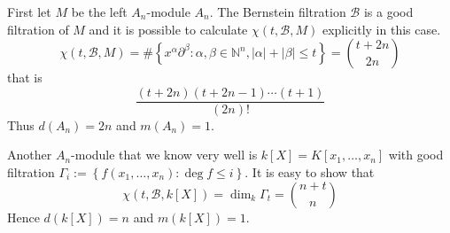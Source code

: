\documentclass[12pt, oneside]{book}
\begin{document}
\begin{example}
    First let $M$ be the left $A_n$-module $A_n$.
    The Bernstein filtration $\mathcal{B}$ is a good filtration of $M$ and it is possible to calculate $\chi(t, \mathcal{B}, M)$ explicitly in this case.
    \begin{equation*}
        \chi(t, \mathcal{B}, M)=
        \#\left\{x^\alpha \partial^\beta : \alpha,\beta \in \mathbb{N}^n, \left|\alpha\right|+\left|\beta\right| \leq t\right\}
        =
        \binom{t+2 n}{2 n}
    \end{equation*}
    that is
    \begin{equation*}
        \frac{(t+2n)(t+2n-1)\cdots (t+1)}{(2n)!}
    \end{equation*}
    Thus $d\left(A_n\right)=2 n$ and $m\left(A_n\right)=1$.
\end{example}

\begin{example}
    Another $A_n$-module that we know very well is $k[X]=K\left[x_1, \ldots, x_n\right]$ with good filtration $\Gamma_i:=\left\{f\left(x_1,\ldots,x_n\right):\deg f \leq i\right\}$.
    It is easy to show that
    \begin{equation*}
        \chi(t, \mathcal{B}, k[X])
        =
        \operatorname{dim}_k \Gamma_t=\binom{n+t}{n}
    \end{equation*}
    Hence $d(k[X])=n$ and $m(k[X])=1$.
\end{example}
\end{document}
